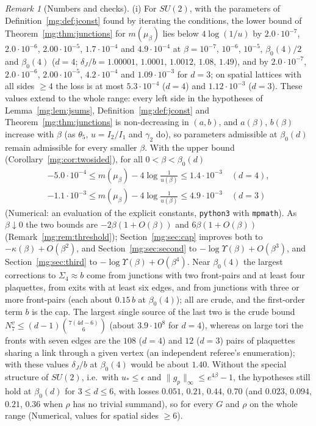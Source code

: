 \documentclass[11pt,a4paper]{article}
\theoremstyle{definition}
\theoremstyle{remark}
\newtheorem{remark}[theorem]{Remark}
\newcommand{\norm}[1]{\lVert #1\rVert}
\begin{document}
\begin{remark}[Numbers and checks]\label{mg:rem:junctions}
(i) For $SU(2)$, with the parameters of Definition~\ref{mg:def:jconst} found by iterating the conditions, the lower bound of
Theorem~\ref{mg:thm:junctions} for $m(\mu_\beta)$ lies below $4\log(1/u)$ by $2.0\cdot10^{-7}$, $2.0\cdot10^{-6}$, $2.00\cdot10^{-5}$, $1.7\cdot10^{-4}$ and
$4.9\cdot10^{-4}$ at $\beta=10^{-7}$, $10^{-6}$, $10^{-5}$, $\beta_0(4)/2$ and $\beta_0(4)$ ($d=4$; $\delta_J/b=1.00001$, $1.0001$, $1.0012$, $1.08$, $1.49$), and by
$2.0\cdot10^{-7}$, $2.0\cdot10^{-6}$, $2.00\cdot10^{-5}$, $4.2\cdot10^{-4}$ and $1.09\cdot10^{-3}$ for $d=3$; on spatial lattices with all sides $\ge4$ the
loss is at most $5.3\cdot10^{-4}$ ($d=4$) and $1.12\cdot10^{-3}$ ($d=3$). These values extend to the whole range: every left side in the hypotheses of
Lemma~\ref{mg:lem:jsums}, Definition~\ref{mg:def:jconst} and Theorem~\ref{mg:thm:junctions} is non-decreasing in $(a,b)$, and $a(\beta)$, $b(\beta)$ increase with
$\beta$ (as $\theta_5$, $u=I_2/I_1$ and $\gamma_2$ do), so parameters admissible at $\beta_0(d)$ remain admissible for every smaller $\beta$. With the upper bound
(Corollary~\ref{mg:cor:twosided}), for all $0<\beta<\beta_0(d)$
\begin{gather*}
-5.0\cdot10^{-4}\le m(\mu_\beta)-4\log\frac1{u(\beta)}\le1.4\cdot10^{-3}\quad(d=4),\\
-1.1\cdot10^{-3}\le m(\mu_\beta)-4\log\frac1{u(\beta)}\le4.9\cdot10^{-3}\quad(d=3)
\end{gather*}
(Numerical: an evaluation of the explicit constants, \texttt{python3} with \texttt{mpmath}). As $\beta\downarrow0$ the two bounds are
$-2\beta(1+O(\beta))$ and $6\beta(1+O(\beta))$ (Remark~\ref{mg:rem:threshold}); Section~\ref{mg:sec:cap} improves both to $-\kappa(\beta)+O(\beta^2)$, and
Section~\ref{mg:sec:second} to $-\log\Upsilon(\beta)+O(\beta^3)$, and Section~\ref{mg:sec:third} to $-\log\Upsilon(\beta)+O(\beta^4)$. Near $\beta_0(4)$ the largest corrections to $\Sigma_4\approx b$ come from
junctions with two front-pairs and at least four plaquettes, from exits with at least six edges, and from junctions with three or more front-pairs
(each about $0.15\,b$ at $\beta_0(4)$); all are crude, and the first-order term $b$ is the cap. The largest single source of the last two is the crude bound
$N^v_7\le(d-1)\binom{7(4d-6)}{6}$ (about $3.9\cdot10^8$ for $d=4$), whereas on large tori the fronts with seven edges are the $108$ ($d=4$) and $12$ ($d=3$)
pairs of plaquettes sharing a link through a given vertex (an independent referee's enumeration); with these values $\delta_J/b$ at $\beta_0(4)$ would be
about $1.40$. Without the special structure of $SU(2)$, i.e.\ with $u_*\le\epsilon$ and $\norm{g_p}_\infty\le e^{4\beta}-1$, the hypotheses still hold at
$\beta_0(d)$ for $3\le d\le6$, with losses $0.051$, $0.21$, $0.44$, $0.70$ (and $0.023$, $0.094$, $0.21$, $0.36$ when $\rho$ has no trivial summand), so for
every $G$ and $\rho$ on the whole range (Numerical, values for spatial sides $\ge6$).


\end{remark}
\end{document}

